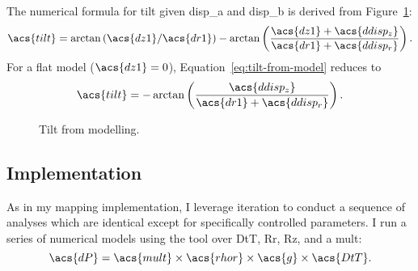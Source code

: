 The numerical formula for \acf{tilt} given \acs{disp_a} and \acs{disp_b} is derived from Figure~\ref{fig:tilt-from-model}:
\begin{equation}
    \acs{tilt} = \arctan\left({\acs{dz1}}/{\acs{dr1}}\right) - \arctan\left(\dfrac{\acs{dz1}+\acs{ddisp_z}}{\acs{dr1}+\acs{ddisp_r}}\right).\label{eq:tilt-from-model}
\end{equation}
For a flat model ($\acs{dz1} = 0$), Equation~\eqref{eq:tilt-from-model} reduces to
\begin{equation}
    \acs{tilt} = 
    -\arctan\left(\dfrac{\acs{ddisp_z}}{\acs{dr1}+\acs{ddisp_r}}\right).\label{eq:tilt-from-flat-model}
\end{equation}

\begin{figure}
    \caption[\Acl{tilt} from modelling]{Tilt from modelling.}%
    \label{fig:tilt-from-model}%
\end{figure}

\subsection{Implementation}

As in my mapping implementation, I leverage iteration to conduct a sequence of analyses which are identical except for specifically controlled parameters. I run a series of numerical models using the  tool over \ac{DtT}, \ac{Rr}, \ac{Rz}, and a \ac{mult}:
\begin{equation}
    \acs{dP}=\acs{mult}\times\acs{rhor}\times\acs{g}\times\acs{DtT}.
\end{equation}
